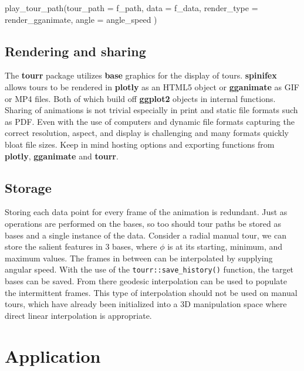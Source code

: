 \begin{Schunk}
\begin{Sinput}
play_tour_path(tour_path = f_path,
               data = f_data,
               render_type = render_gganimate, 
               angle = angle_speed
)
\end{Sinput}
\end{Schunk}

\hypertarget{rendering-and-sharing}{%
\subsection{Rendering and sharing}\label{rendering-and-sharing}}

The \textbf{tourr} package utilizes \textbf{base} graphics for the
display of tours. \textbf{spinifex} allows tours to be rendered in
\textbf{plotly} as an HTML5 object or \textbf{gganimate} as GIF or MP4
files. Both of which build off \textbf{ggplot2} objects in internal
functions. Sharing of animations is not trivial especially in print and
static file formats such as PDF. Even with the use of computers and
dynamic file formats capturing the correct resolution, aspect, and
display is challenging and many formats quickly bloat file sizes. Keep
in mind hosting options and exporting functions from \textbf{plotly},
\textbf{gganimate} and \textbf{tourr}.

\hypertarget{storage}{%
\subsection{Storage}\label{storage}}

Storing each data point for every frame of the animation is redundant.
Just as operations are performed on the bases, so too should tour paths
be stored as bases and a single instance of the data. Consider a radial
manual tour, we can store the salient features in 3 bases, where
\(\phi\) is at its starting, minimum, and maximum values. The frames in
between can be interpolated by supplying angular speed. With the use of
the \texttt{tourr::save\_history()} function, the target bases can be
saved. From there geodesic interpolation can be used to populate the
intermittent frames. This type of interpolation should not be used on
manual tours, which have already been initialized into a 3D manipulation
space where direct linear interpolation is appropriate.

\hypertarget{sec:application}{%
\section{Application}\label{sec:application}}

